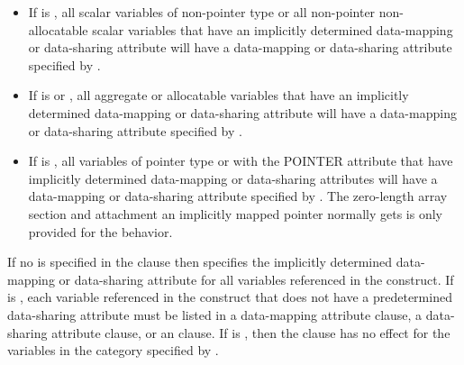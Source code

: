\begin{itemize}

  \item If  is , all scalar variables of
    non-pointer type or all non-pointer non-allocatable scalar variables that
    have an implicitly determined data-mapping or data-sharing attribute will
    have a data-mapping or data-sharing attribute specified by
    .

\item  If  is  or , all aggregate or
  allocatable variables that have an implicitly determined data-mapping or
  data-sharing attribute will have a data-mapping or data-sharing attribute
  specified by .

\item If  is , all variables of pointer
  type or with the POINTER attribute that have implicitly determined
  data-mapping or data-sharing attributes will have a data-mapping or
  data-sharing attribute specified by .  The zero-length
  array section and attachment an implicitly mapped pointer normally gets is
  only provided for the  behavior.

\end{itemize}
 
If no  is specified in the clause then
specifies the implicitly determined data-mapping or data-sharing attribute for
all variables referenced in the construct.
If  is , each variable referenced in the construct that
does not have a predetermined data-sharing attribute must be listed in a
data-mapping attribute clause, a data-sharing attribute clause, or an
 clause. If  is , then the
clause has no effect for the variables in the category specified by .

